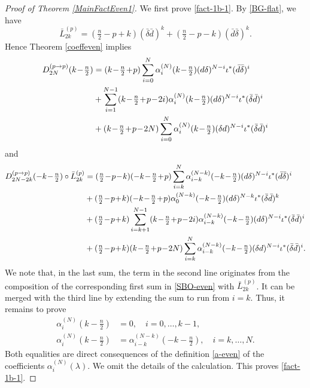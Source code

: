\documentclass[a4paper,12pt,reqno]{amsart}
\numberwithin{theorem}{subsection}
\numberwithin{equation}{section}
\begin{document}
\begin{proof} [Proof of Theorem \ref{MainFactEven1}] We first prove \eqref{fact-1b-1}.
By \eqref{BG-flat}, we have
\begin{equation}\label{Lbar-flat}
   \bar{L}^{(p)}_{2k} = (\tfrac n2\!-\!p\!+\!k) (\bar{\delta} \bar{d})^k
   + (\tfrac n2\!-\!p\!-\!k) (\bar{d}\bar{\delta})^k.
\end{equation}
Hence Theorem \ref{coeffeven} implies
\begin{align*}
   D_{2N}^{(p\to p)}(k\!-\!\tfrac n2)
   & = (k\!-\!\tfrac n2\!+\!p)\sum_{i=0}^N \alpha_i^{(N)}(k\!-\!\tfrac n2)
   ({d}\delta)^{N-i} \iota^* (\bar{d} \bar{\delta})^i  \notag\\
   & + \sum_{i=1}^{N-1} (k\!-\!\tfrac n2\!+\!p\!-\!2i) \alpha_i^{(N)}(k\!-\!\tfrac n2)
   ({d} \delta)^{N-i} \iota^* (\bar{\delta} \bar{d})^i \notag\\
   & + (k\!-\!\tfrac n2\!+\!p\!-\!2N) \sum_{i=0}^N \alpha_i^{(N)}(k\!-\!\tfrac n2)
   (\delta {d})^{N-i} \iota^*(\bar{\delta} \bar{d})^i
\end{align*}
and
\begin{align*}
   D_{2N-2k}^{(p\to p)}(-k\!-\!\tfrac n2) \circ \bar{L}^{(p)}_{2k}
   & = (\tfrac n2\!-\!p\!-\!k) (-k\!-\!\tfrac n2\!+\!p) \sum_{i=k}^N \alpha_{i-k}^{(N-k)}(-k\!-\!\tfrac n2)
   ({d} \delta)^{N-i} \iota^* (\bar{d} \bar{\delta})^i \notag \\
   & +(\tfrac n2\!-\!p\!+\!k) (-k\!-\!\tfrac n2\!+\!p) \alpha_{0}^{(N-k)}(-k\!-\!\tfrac n2)
   ({d} \delta)^{N-k} \iota^* (\bar{\delta} \bar{d})^k \notag \\
   & +(\tfrac n2\!-\!p\!+\!k) \sum_{i=k+1}^{N-1} (k\!-\!\tfrac n2\!+\!p\!-\!2i)
   \alpha_{i-k}^{(N-k)}(-k\!-\!\tfrac n2) ({d} \delta)^{N-i} \iota^* (\bar{\delta} \bar{d})^i \notag \\
   & + (\tfrac n2\!-\!p\!+\!k) (k\!-\!\tfrac n2\!+\!p\!-\!2N) \sum_{i=k}^N  \alpha_{i-k}^{(N-k)}(-k\!-\!\tfrac n2)
   (\delta {d})^{N-i} \iota^*(\bar{\delta} \bar{d})^i.
\end{align*}
We note that, in the last sum, the term in the second line originates from the
composition of the corresponding first sum in \eqref{SBO-even} with
$\bar{L}^{(p)}_{2k}$. It can be merged with the third line by extending the sum
to run from $i=k$. Thus, it remains to prove
\begin{align*}
   \alpha_i^{(N)}(k-\tfrac n2) & = 0, \quad i=0,\dots,k-1,\\
   \alpha_i^{(N)}(k-\tfrac n2) & = \alpha_{i-k}^{(N-k)}(-k-\tfrac n2),\quad i=k,\dots,N.
\end{align*}
Both equalities are direct consequences of the definition \eqref{a-even} of the
coefficients $\alpha_i^{(N)}(\lambda)$. We omit the details of the calculation.
This proves \eqref{fact-1b-1}.


\end{proof}
\end{document}
